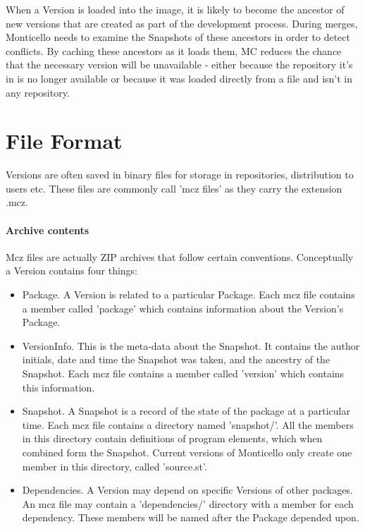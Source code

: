 \documentclass[a4paper,10pt,twoside]{book}
\begin{document}
When a Version is loaded into the image, it is likely to become the ancestor of new versions that are created as part of the development process. During merges, Monticello needs to examine the Snapshots of these ancestors in order to detect conflicts. By caching these ancestors as it loads them, MC reduces the chance that the necessary version will be unavailable - either because the repository it's in is no longer available or because it was loaded directly from a file and isn't in any repository.


\section{File Format}

Versions are often saved in binary files for storage in repositories, distribution to users etc. These files are commonly call 'mcz files' as they carry the extension .mcz.

\paragraph{Archive contents}

Mcz files are actually ZIP archives that follow certain conventions. Conceptually a Version contains four things:

\begin{itemize}
\item Package. A Version is related to a particular Package. Each mcz file contains a member called 'package' which contains information about the Version's Package.

\item VersionInfo. This is the meta-data about the Snapshot. It contains the author initials, date and time the Snapshot was taken, and the ancestry of the Snapshot. Each mcz file contains a member called 'version' which contains this information.
\item Snapshot. A Snapshot is a record of the state of the package at a particular time. Each mcz file contains a directory named 'snapshot/'. All the members in this directory contain definitions of program elements, which when combined form the Snapshot. Current versions of Monticello only create one member in this directory, called 'source.st'.
\item Dependencies. A Version may depend on specific Versions of other packages. An mcz file may contain a 'dependencies/' directory with a member for each dependency. These members will be named after the Package depended upon.
\end{itemize}
\end{document}
